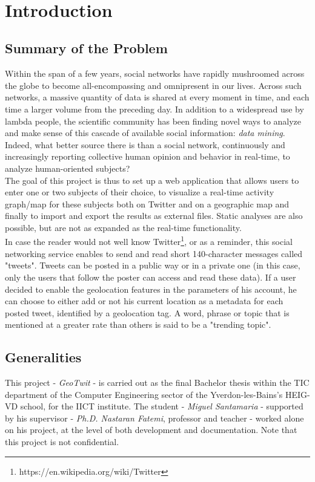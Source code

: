 \documentclass[a4paper,11pt]{report}
\begin{document}
\tableofcontents
\newpage
\thispagestyle{empty}
~
\newpage
\thispagestyle{empty}
~
\newpage

\setcounter{page}{4}
\chapter{Introduction}
\section{Summary of the Problem}
Within the span of a few years, social networks have rapidly mushroomed across the globe to become all-encompassing and omnipresent in our lives. Across such networks, a massive quantity of data is shared at every moment in time, and each time a larger volume from the preceding day. In addition to a widespread use by lambda people, the scientific community has been finding novel ways to analyze and make sense of this cascade of available social information: \emph{data mining}. Indeed, what better source there is than a social network, continuously and increasingly reporting collective human opinion and behavior in real-time, to analyze human-oriented subjects?\\

The goal of this project is thus to set up a web application that allows users to enter one or two subjects of their choice, to visualize a real-time activity graph/map for these subjects both on Twitter and on a geographic map and finally to import and export the results as external files. Static analyses are also possible, but are not as expanded as the real-time functionality.\\

In case the reader would not well know Twitter\footnote{https://en.wikipedia.org/wiki/Twitter}, or as a reminder, this social networking service enables to send and read short 140-character messages called "tweets". Tweets can be posted in a public way or in a private one (in this case, only the users that follow the poster can access and read these data). If a user decided to enable the geolocation features in the parameters of his account, he can choose to either add or not his current location as a metadata for each posted tweet, identified by a geolocation tag. A word, phrase or topic that is mentioned at a greater rate than others is said to be a "trending topic".
\newpage	

\section{Generalities}
This project - \emph{GeoTwit} - is carried out as the final Bachelor thesis within the TIC department of the Computer Engineering sector of the Yverdon-les-Bains's HEIG-VD school, for the IICT institute. The student - \emph{Miguel Santamaria} - supported by his supervisor - \emph{Ph.D. Nastaran Fatemi}, professor and teacher - worked alone on his project, at the level of both development and documentation. Note that this project is not confidential.\\
\end{document}
